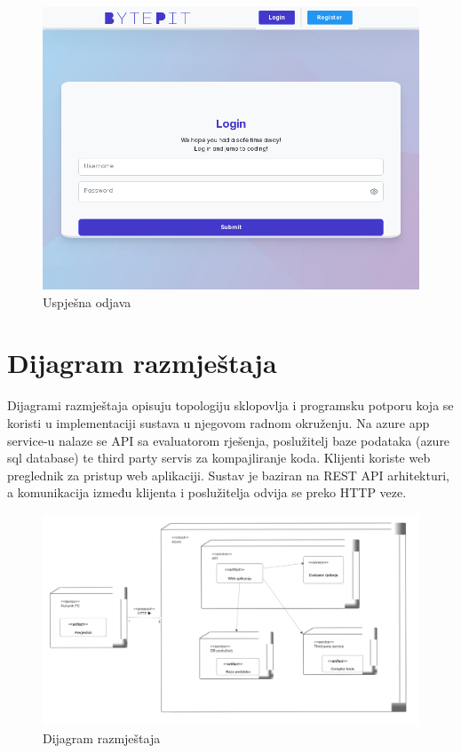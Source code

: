 			\begin{figure}[H]
				\includegraphics[scale=0.50]{slike/screen_after_logout.PNG}
				\centering
				\caption{Uspješna odjava}
				\label{fig:sucess_logout}
			\end{figure}
			
			
			\eject 
		
		
		\section{Dijagram razmještaja}

			 Dijagrami razmještaja opisuju topologiju sklopovlja i programsku potporu koja se koristi u implementaciji sustava u njegovom radnom okruženju.
			 Na azure app service-u nalaze se API sa evaluatorom rješenja, poslužitelj baze podataka (azure sql database) te third party servis za kompajliranje koda.
			 Klijenti koriste web preglednik za pristup web aplikaciji. Sustav je baziran na REST API arhitekturi, a komunikacija između klijenta i poslužitelja odvija se preko HTTP veze.

			 
			
			\begin{figure}[H]
				\includegraphics[width=\linewidth]{slike/dijagram_razmjestaja.png} 
				\centering
				\caption{Dijagram razmještaja}
				\label{fig:razmjestaj}
			\end{figure}
			\eject 
		
